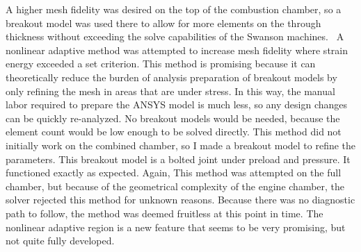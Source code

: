 A higher mesh fidelity was desired on the top of the combustion chamber, so a breakout model was used there to allow for more elements on the through thickness without exceeding the solve capabilities of the Swanson machines.  A nonlinear adaptive method was attempted to increase mesh fidelity where strain energy exceeded a set criterion. This method is promising because it can theoretically reduce the burden of analysis preparation of breakout models by only refining the mesh in areas that are under stress. In this way, the manual labor required to prepare the ANSYS model is much less, so any design changes can be quickly re-analyzed. No breakout models would be needed, because the element count would be low enough to be solved directly. This method did not initially work on the combined chamber, so I made a breakout model to refine the parameters. This breakout model is a bolted joint under preload and pressure. It functioned exactly as expected. Again, This method was attempted on the full chamber, but because of the geometrical complexity of the engine chamber, the solver rejected this method for unknown reasons. Because there was no diagnostic path to follow, the method was deemed fruitless at this point in time. The nonlinear adaptive region is a new feature that seems to be very promising, but not quite fully developed. 

